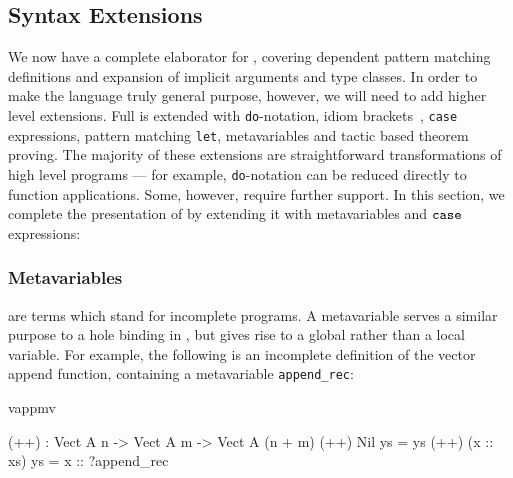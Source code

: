 \subsection{Syntax Extensions}

We now have a complete elaborator for \IdrisM{}, covering 
dependent pattern matching definitions and expansion of implicit arguments
and type classes. In order to make the language truly general purpose, however, we
will need to add higher level extensions. Full \Idris{} is \IdrisM{} extended
with \texttt{do}-notation, idiom brackets~\cite{McBride2007}, \texttt{case} expressions,
pattern matching \texttt{let}, metavariables and tactic based theorem proving.
The majority of these extensions are straightforward transformations of high level
\Idris{} programs --- for example, \texttt{do}-notation can be reduced directly to
\IdrisM{} function applications. Some, however, require further support. In this section,
we complete the presentation of \IdrisM{} by extending it with metavariables
and $\mathtt{case}$ expressions:


\subsubsection{Metavariables}

 are terms which stand for incomplete programs. A
metavariable serves a similar
purpose to a hole binding in \TT{}, but gives rise to a global rather than a
local variable. For example, the following is an incomplete definition of
the vector append function, containing a metavariable \texttt{append\_rec}:

\begin{SaveVerbatim}{vappmv}

(++) : Vect A n -> Vect A m -> Vect A (n + m)
(++) Nil       ys = ys
(++) (x :: xs) ys = x :: ?append_rec

\end{SaveVerbatim}

